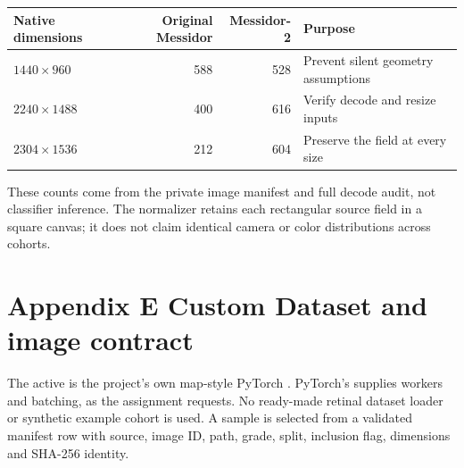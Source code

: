 \small
\begin{tabularx}{\linewidth}{@{}p{.32\linewidth}rrY@{}}
\toprule
Native dimensions & Original Messidor & Messidor-2 & Purpose\\
\midrule
$1440\times960$ & 588 & 528 & Prevent silent geometry assumptions\\
$2240\times1488$ & 400 & 616 & Verify decode and resize inputs\\
$2304\times1536$ & 212 & 604 & Preserve the field at every size\\
\bottomrule
\end{tabularx}
\normalsize
These counts come from the private image manifest and full decode audit,
not classifier inference. The normalizer retains each rectangular source
field in a square canvas; it does not claim identical camera or color
distributions across cohorts.

\newpage
\section*{\color{ink}Appendix E \quad Custom Dataset and image contract}
The active  is the project's own map-style PyTorch
. PyTorch's  supplies workers and batching,
as the assignment requests. No ready-made retinal dataset loader or
synthetic example cohort is used. A sample is selected from a validated
manifest row with source, image ID, path, grade, split, inclusion flag,
dimensions and SHA-256 identity.

\begin{center}
\end{center}

